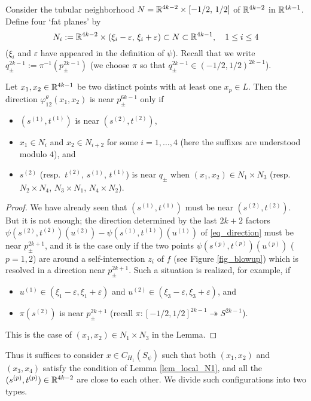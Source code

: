 Consider the tubular neighborhood $N=\mathbb{R}^{4k-2} \times [-1/2,\, 1/2]$ of $\mathbb{R}^{4k-2}$ in $\mathbb{R}^{4k-1}$.
Define four `fat planes' by
\[
 N_i := \mathbb{R}^{4k-2} \times (\xi_i -\varepsilon ,\, \xi_i + \varepsilon ) \subset N \subset \mathbb{R}^{4k-1}, \quad 1 \le i \le 4
\]
($\xi_i$ and $\varepsilon$ have appeared in the definition of $\psi$).
Recall that we write $q^{2k-1}_{\pm} :=\pi^{-1}(p^{2k-1}_{\pm})$ (we choose $\pi$ so that
$q^{2k-1}_{\pm} \in (-1/2,1/2)^{2k-1}$).


\begin{lem}\label{lem_local_N1}
Let $x_1 , x_2 \in \mathbb{R}^{4k-1}$ be two distinct points with at least one $x_p \in L$.
Then the direction $\varphi^{\theta}_{12}(x_1 ,x_2 )$ is near $p^{6k-1}_{\pm}$ only if
\begin{itemize}
\item $(s^{(1)},t^{(1)})$ is near $(s^{(2)},t^{(2)})$,
\item $x_1 \in N_i$ and $x_2 \in N_{i+2}$ for some $i =1,\dots ,4$ (here the suffixes are understood modulo $4$), and
\item $s^{(2)}$ (resp.\ $t^{(2)}$, $s^{(1)}$, $t^{(1)}$) is near $q_{\pm}$ when $(x_1 ,x_2 )\in N_1 \times N_3$
 (resp.\ $N_2 \times N_4$, $N_3 \times N_1$, $N_4 \times N_2$).
\end{itemize}
\end{lem}


\begin{proof}
We have already seen that $(s^{(1)},t^{(1)})$ must be near $(s^{(2)},t^{(2)})$.
But it is not enough; the direction determined by the last $2k+2$ factors
$\psi (s^{(2)},t^{(2)})(u^{(2)})-\psi (s^{(1)},t^{(1)})(u^{(1)})$ of \eqref{eq_direction} must be near $p^{2k+1}_{\pm}$,
and it is the case only if the two points $\psi (s^{(p)},t^{(p)})(u^{(p)})$ ($p=1,2$) are around a self-intersection
$z_i$ of $f$ (see Figure \ref{fig_blowup}) which is resolved in a direction near $p^{2k+1}_{\pm}$.
Such a situation is realized, for example, if
\begin{itemize}
\item $u^{(1)} \in (\xi_1 -\varepsilon ,\xi_1 +\varepsilon )$ and
 $u^{(2)} \in (\xi_3 -\varepsilon ,\xi_3 +\varepsilon )$, and
\item $\pi (s^{(2)})$ is near $p^{2k+1}_{\pm}$ (recall $\pi : [-1/2,1/2]^{2k-1} \twoheadrightarrow S^{2k-1}$).
\end{itemize}
This is the case of $(x_1 ,x_2 ) \in N_1 \times N_3$ in the Lemma.
\end{proof}


Thus it suffices to consider $x\in C_{H_1}(S_{\psi})$ such that both $(x_1 ,x_2 )$ and $(x_3 ,x_4 )$ satisfy the
condition of Lemma \ref{lem_local_N1}, and all the $(s^{(p)},t^{(p)})\in \mathbb{R}^{4k-2}$ are close to each other.
We divide such configurations into two types.


